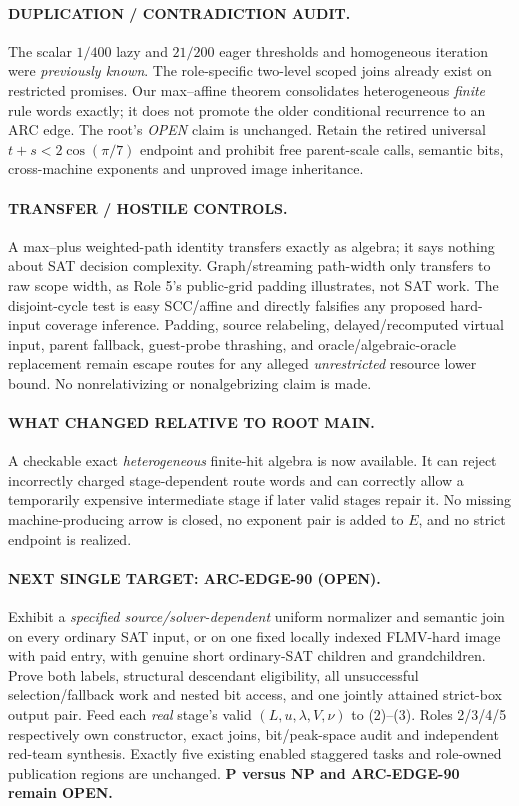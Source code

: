 \documentclass[11pt]{article}
\begin{document}
\paragraph{DUPLICATION / CONTRADICTION AUDIT.}
The scalar $1/400$ lazy and $21/200$ eager thresholds
and homogeneous iteration were \emph{previously known}.
The role-specific two-level scoped joins already exist on
restricted promises. Our max--affine theorem consolidates
heterogeneous \emph{finite} rule words exactly; it does not
promote the older conditional recurrence to an ARC edge.
The root's \emph{OPEN} claim is unchanged. Retain the
retired universal $t+s<2\cos(\pi/7)$ endpoint
and prohibit free parent-scale calls, semantic bits,
cross-machine exponents and unproved image inheritance.

\paragraph{TRANSFER / HOSTILE CONTROLS.}
A max--plus weighted-path identity transfers exactly as
algebra; it says nothing about SAT decision complexity.
Graph/streaming path-width only transfers to raw scope width,
as Role 5's public-grid padding illustrates, not SAT work.
The disjoint-cycle test is easy SCC/affine and directly
falsifies any proposed hard-input coverage inference.
Padding, source relabeling, delayed/recomputed virtual input,
parent fallback, guest-probe thrashing,
and oracle/algebraic-oracle replacement remain escape routes
for any alleged \emph{unrestricted} resource lower bound.
No nonrelativizing or nonalgebrizing claim is made.

\paragraph{WHAT CHANGED RELATIVE TO ROOT MAIN.}
A checkable exact \emph{heterogeneous} finite-hit algebra
is now available. It can reject incorrectly charged
stage-dependent route words and can correctly allow
a temporarily expensive intermediate stage if later
valid stages repair it. No missing machine-producing arrow
is closed, no exponent pair is added to $E$,
and no strict endpoint is realized.

\paragraph{NEXT SINGLE TARGET: ARC-EDGE-90 (OPEN).}
Exhibit a \emph{specified source/solver-dependent}
uniform normalizer and semantic join on every ordinary
SAT input, or on one fixed locally indexed FLMV-hard image
with paid entry, with genuine short ordinary-SAT
children and grandchildren. Prove both labels,
structural descendant eligibility, all unsuccessful
selection/fallback work and nested bit access, and
one jointly attained strict-box output pair. Feed
each \emph{real} stage's valid $(L,u,\lambda,V,\nu)$
to (2)--(3). Roles 2/3/4/5 respectively own
constructor, exact joins, bit/peak-space audit
and independent red-team synthesis.
Exactly five existing enabled staggered tasks and
role-owned publication regions are unchanged.
\textbf{P versus NP and ARC-EDGE-90 remain OPEN.}
\end{document}

